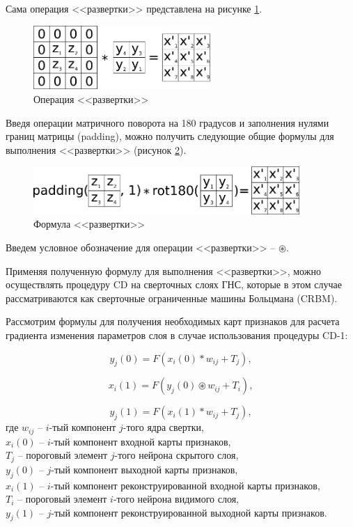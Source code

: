 Сама операция <<развертки>> представлена на рисунке \ref{fig:deconvolution}.

\begin{figure}[H]
  \centering
  \includegraphics[width=0.6\textwidth]{man-source/images/ch2/pic2-6.png}
  \caption{Операция <<развертки>>}
  \label{fig:deconvolution}
\end{figure}

Введя операции матричного поворота на 180 градусов и заполнения нулями границ матрицы (padding), можно получить следующие общие формулы для выполнения <<развертки>> (рисунок \ref{fig:deconvolution_formula}).

\begin{figure}[H]
  \centering
  \includegraphics[width=0.9\textwidth]{man-source/images/ch2/pic2-9.png}
  \caption{Формула <<развертки>>}
  \label{fig:deconvolution_formula}
\end{figure}

Введем условное обозначение для операции <<развертки>> -- $\circledast$.

Применяя полученную формулу для выполнения <<развертки>>, можно осуществлять процедуру CD на сверточных слоях ГНС, которые в этом случае рассматриваются как сверточные ограниченные машины Больцмана (CRBM). 

Рассмотрим формулы для получения необходимых карт признаков для расчета градиента изменения параметров слоя в случае использования процедуры CD-1: 

\begin{equation*}
    y_j(0) = F(x_i(0) * w_{ij} + T_j),
\end{equation*}

\begin{equation*}
    x_i(1) = F(y_j(0) \circledast w_{ij} + T_i),
\end{equation*}

\begin{equation*}
    y_j(1) = F(x_i(1) * w_{ij} + T_j),
\end{equation*}
где $w_{ij}$ -- $i$-тый компонент $j$-того ядра свертки,\\
$x_i(0)$ -- $i$-тый компонент входной карты признаков,\\
$T_j$ -- пороговый элемент $j$-того нейрона скрытого слоя,\\
$y_j(0)$ -- $j$-тый компонент выходной карты признаков,\\
$x_i(1)$ -- $i$-тый компонент реконструированной входной карты признаков,\\
$T_i$ -- пороговый элемент $i$-того нейрона видимого слоя,\\
$y_j(1)$ -- $j$-тый компонент реконструированной выходной карты признаков.

